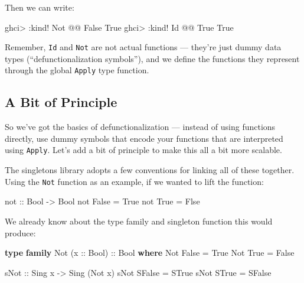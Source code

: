 \documentclass[]{article}
\newenvironment{Shaded}{}{}
\newcommand{\DataTypeTok}[1]{\textcolor[rgb]{0.56,0.13,0.00}{#1}}
\newcommand{\FunctionTok}[1]{\textcolor[rgb]{0.02,0.16,0.49}{#1}}
\newcommand{\KeywordTok}[1]{\textcolor[rgb]{0.00,0.44,0.13}{\textbf{#1}}}
\newcommand{\NormalTok}[1]{#1}
\newcommand{\OperatorTok}[1]{\textcolor[rgb]{0.40,0.40,0.40}{#1}}
\newcommand{\OtherTok}[1]{\textcolor[rgb]{0.00,0.44,0.13}{#1}}
\begin{document}
Then we can write:

\begin{Shaded}
\begin{Highlighting}[]
\NormalTok{ghci}\OperatorTok{>} \OperatorTok{:}\NormalTok{kind}\OperatorTok{!} \DataTypeTok{Not} \OperatorTok{@@} \DataTypeTok{\textquotesingle{}False}
\DataTypeTok{\textquotesingle{}True}
\NormalTok{ghci}\OperatorTok{>} \OperatorTok{:}\NormalTok{kind}\OperatorTok{!} \DataTypeTok{Id} \OperatorTok{@@} \DataTypeTok{\textquotesingle{}True}
\DataTypeTok{\textquotesingle{}True}
\end{Highlighting}
\end{Shaded}

Remember, \texttt{Id} and \texttt{Not} are not actual functions --- they're just
dummy data types (``defunctionalization symbols''), and we define the functions
they represent through the global \texttt{Apply} type function.

\hypertarget{a-bit-of-principle}{%
\subsection{A Bit of Principle}\label{a-bit-of-principle}}

So we've got the basics of defunctionalization --- instead of using functions
directly, use dummy symbols that encode your functions that are interpreted
using \texttt{Apply}. Let's add a bit of principle to make this all a bit more
scalable.

The singletons library adopts a few conventions for linking all of these
together. Using the \texttt{Not} function as an example, if we wanted to lift
the function:

\begin{Shaded}
\begin{Highlighting}[]
\FunctionTok{not}\OtherTok{ ::} \DataTypeTok{Bool} \OtherTok{{-}>} \DataTypeTok{Bool}
\FunctionTok{not} \DataTypeTok{False} \OtherTok{=} \DataTypeTok{True}
\FunctionTok{not} \DataTypeTok{True}  \OtherTok{=} \DataTypeTok{Flse}
\end{Highlighting}
\end{Shaded}

We already know about the type family and singleton function this would produce:

\begin{Shaded}
\begin{Highlighting}[]
\KeywordTok{type} \KeywordTok{family} \DataTypeTok{Not}\NormalTok{ (}\OtherTok{x ::} \DataTypeTok{Bool}\NormalTok{)}\OtherTok{ ::} \DataTypeTok{Bool} \KeywordTok{where}
    \DataTypeTok{Not} \DataTypeTok{\textquotesingle{}False} \OtherTok{=} \DataTypeTok{\textquotesingle{}True}
    \DataTypeTok{Not} \DataTypeTok{\textquotesingle{}True}  \OtherTok{=} \DataTypeTok{\textquotesingle{}False}

\OtherTok{sNot ::} \DataTypeTok{Sing}\NormalTok{ x }\OtherTok{{-}>} \DataTypeTok{Sing}\NormalTok{ (}\DataTypeTok{Not}\NormalTok{ x)}
\NormalTok{sNot }\DataTypeTok{SFalse} \OtherTok{=} \DataTypeTok{STrue}
\NormalTok{sNot }\DataTypeTok{STrue}  \OtherTok{=} \DataTypeTok{SFalse}
\end{Highlighting}
\end{Shaded}
\end{document}
